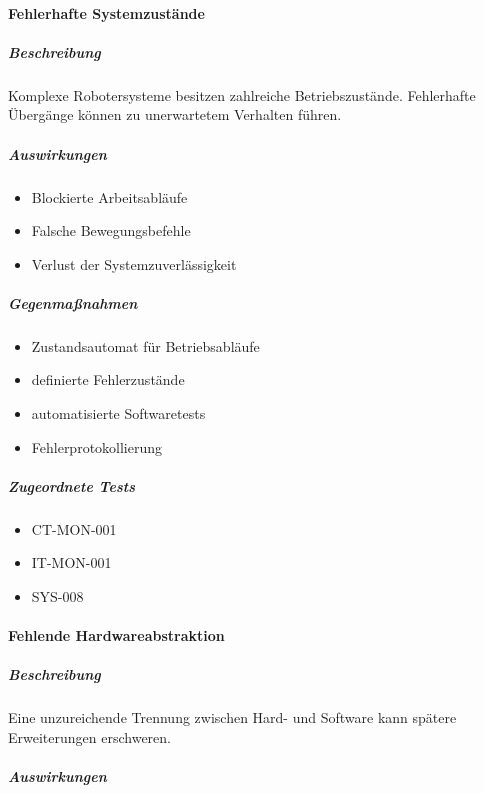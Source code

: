 \documentclass[
  a4paper,
  12pt,
  DIV=12,        %
  parskip=half,  %
  headings=small %
]{scrartcl}
\theoremstyle{definition}
\providecommand{\tightlist}{%
  \setlength{\itemsep}{0pt}\setlength{\parskip}{0pt}}
\theoremstyle{definition}
\begin{document}
\paragraph{Fehlerhafte
Systemzustände}\label{fehlerhafte-systemzustuxe4nde}

\subparagraph{Beschreibung}\label{beschreibung-3}

Komplexe Robotersysteme besitzen zahlreiche Betriebszustände.
Fehlerhafte Übergänge können zu unerwartetem Verhalten führen.

\subparagraph{Auswirkungen}\label{auswirkungen-3}

\begin{itemize}
\tightlist
\item
  Blockierte Arbeitsabläufe
\item
  Falsche Bewegungsbefehle
\item
  Verlust der Systemzuverlässigkeit
\end{itemize}

\subparagraph{Gegenmaßnahmen}\label{gegenmauxdfnahmen-2}

\begin{itemize}
\tightlist
\item
  Zustandsautomat für Betriebsabläufe
\item
  definierte Fehlerzustände
\item
  automatisierte Softwaretests
\item
  Fehlerprotokollierung
\end{itemize}

\subparagraph{Zugeordnete Tests}\label{zugeordnete-tests-2}

\begin{itemize}
\tightlist
\item
  CT-MON-001
\item
  IT-MON-001
\item
  SYS-008
\end{itemize}

\paragraph{Fehlende
Hardwareabstraktion}\label{fehlende-hardwareabstraktion}

\subparagraph{Beschreibung}\label{beschreibung-4}

Eine unzureichende Trennung zwischen Hard- und Software kann spätere
Erweiterungen erschweren.

\subparagraph{Auswirkungen}\label{auswirkungen-4}
\end{document}
